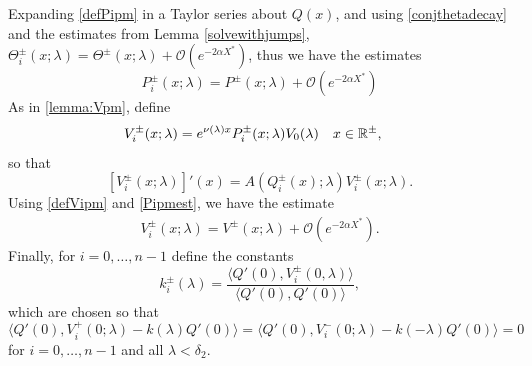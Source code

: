 \documentclass[10pt,reqno]{amsart}
\theoremstyle{plain}
\theoremstyle{definition}
\theoremstyle{remark}
\numberwithin{theorem}{section}
\numberwithin{equation}{section}
\begin{document}
Expanding \cref{defPipm} in a Taylor series about $Q(x)$, and using \cref{conjthetadecay} and the estimates from Lemma \ref{solvewithjumps}, $\Theta_i^\pm(x; \lambda) = \Theta^\pm(x; \lambda) + \mathcal{O}(e^{-2 \alpha X^*})$, thus we have the estimates
\begin{equation}\label{Pipmest}
P_i^\pm(x; \lambda) = P^\pm(x; \lambda) + \mathcal{O}(e^{-2 \alpha X^*})
\end{equation}
As in \cref{lemma:Vpm}, define
\begin{align}\label{defVipm}
V_i^\pm(x; \lambda) &= e^{\nu(\lambda)x} P_i^\pm(x; \lambda)V_0(\lambda) && x \in \mathbb{R}^\pm,
\end{align}
so that
\begin{equation}\label{PDEeigcenter}
[V_i^\pm(x; \lambda)]'(x) = A(Q_i^\pm(x); \lambda) V_i^\pm(x; \lambda).
\end{equation}
Using \cref{defVipm} and \cref{Pipmest}, we have the estimate
\begin{align}\label{Vipmest}
V_i^\pm(x; \lambda) = V^\pm(x; \lambda) + \mathcal{O}(e^{-2 \alpha X^*}).
\end{align}
Finally, for $i = 0, \dots, n-1$ define the constants
\begin{equation}\label{defklambda}
k_i^\pm(\lambda) = \frac{\langle Q'(0), V_i^\pm(0, \lambda) \rangle}{\langle Q'(0), Q'(0) \rangle},
\end{equation}
which are chosen so that
\begin{equation}\label{klambdaIP}
\langle Q'(0), V_i^+(0; \lambda) - k(\lambda)Q'(0) \rangle = 
\langle Q'(0), V_i^-(0; \lambda) - k(-\lambda)Q'(0) \rangle = 0
\end{equation}
for $i = 0, \dots, n-1$ and all $\lambda < \delta_2$. 
\end{document}
